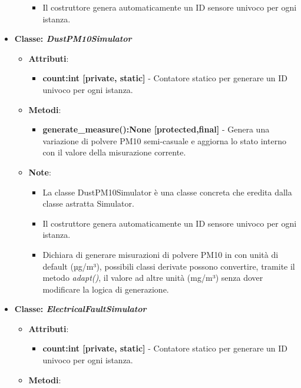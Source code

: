 \begin{itemize}
\begin{itemize}
\begin{itemize}
        \item Il costruttore genera automaticamente un ID sensore univoco per ogni istanza.
    \end{itemize}
\end{itemize}
    \item{\textbf{Classe: \textit{DustPM10Simulator}}}
    \begin{itemize}
        \item   \textbf{Attributi}: 
    \begin{itemize}
        \item \textbf{count:int [private, static]} - Contatore statico per generare un ID univoco per ogni istanza.
    \end{itemize}
    \item    \textbf{Metodi}: 
    \begin{itemize}
        \item \textbf{generate\_measure():None [protected,final]} - Genera una variazione di polvere PM10 semi-casuale e aggiorna lo stato interno con il valore della misurazione corrente.
    \end{itemize}
    \item    \textbf{Note}:
    \begin{itemize}
        \item La classe DustPM10Simulator è una classe concreta che eredita dalla classe astratta Simulator.
        \item Il costruttore genera automaticamente un ID sensore univoco per ogni istanza.
        \item Dichiara di generare misurazioni di polvere PM10 in con unità di default (µg/m³), possibili classi derivate possono convertire, tramite il metodo \textit{adapt()}, il valore ad altre unità (mg/m³) senza dover modificare la logica di generazione.
    \end{itemize}
\end{itemize}
    \item{\textbf{Classe: \textit{ElectricalFaultSimulator}}}
    \begin{itemize}
        \item   \textbf{Attributi}: 
    \begin{itemize}
        \item \textbf{count:int [private, static]} - Contatore statico per generare un ID univoco per ogni istanza.
    \end{itemize}
    \item   \textbf{Metodi}: 
    \begin{itemize}

\end{itemize}
\end{itemize}
\end{itemize}
